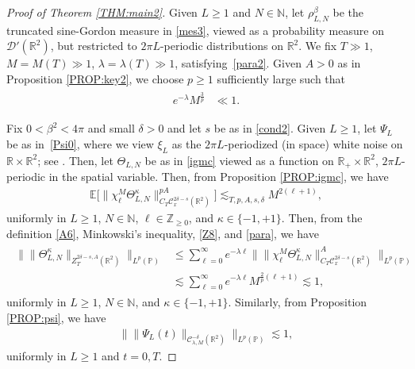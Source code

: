 \documentclass[letterpaper, 11pt,  reqno]{amsart}
\theoremstyle{myremark}
\newcommand{\Ta}{\Theta}
\newcommand{\1}{\hspace{0.5mm}\text{I}\hspace{0.5mm}}
\newcommand{\Z}{\mathbb{Z}}
\newcommand{\R}{\mathbb{R}}
\newcommand{\CC}{\mathcal{C}}
\newcommand{\E}{\mathbb{E}}
\newcommand{\be}{\beta}
\newcommand{\dl}{\delta}
\newcommand{\kk}{\kappa}
\newcommand{\ld}{\lambda}
\renewcommand{\l}{\ell}
\newcommand{\les}{\lesssim}
\newcommand{\N}{\mathbb{N}}
\newcommand{\PP}{\mathbb{P}}
\numberwithin{equation}{section}
\numberwithin{theorem}{section}
\begin{document}
\begin{proof}[Proof of Theorem \ref{THM:main2}]

Given $L \ge 1$ and $N \in \N$, 
let $\rho^{\be}_{L, N}$ be the truncated sine-Gordon measure in \eqref{mes3},
 viewed 
as a probability measure on  $\mathcal D'(\R^2)$, 
but restricted to 
$2\pi L$-periodic distributions  on $\R^2$.
We fix $T \gg 1$, $M = M(T) \gg1$, $\ld=\ld(T)\gg1 $, 
satisfying~\eqref{para2}.
Given   $A > 0$  as in Proposition \ref{PROP:key2}, 
we choose $p \ge 1$ sufficiently large such that 
\begin{align}
\begin{split}
e^{-\ld} M^{\frac 3 p} & \ll 1.
\end{split}
\label{para}
\end{align}


 
 
 Fix 
 $0 < \be^2 < 4\pi$ and small $\dl > 0$
 and let $s$ be as in \eqref{cond2}.
 Given $L \ge 1$, 
 let $\Psi_L$ be as in~\eqref{Psi0}, 
 where we view $\xi_L$ as the $2\pi L$-periodized (in space) white noise
 on $\R \times \R^2$; see \cite[Section 5]{MW2}.
Then, 
let 
  $\Ta_{L, N}$ 
be as in  \eqref{igmc} viewed as a function on $\R_+\times \R^2$, $2\pi L$-periodic in the spatial variable.
Then, from Proposition \ref{PROP:igmc}, we have 
\begin{align}
\E \big[ \| \chi^M_\l \Ta_{L, N}^\kk\|_{C_T \CC_x^{2\dl-s}(\R^2)}^{pA} \big]
 \les_{T,p, A,s,\dl} M^{2(\l+1)}, 
\label{Z8}
\end{align}
uniformly in $L \ge1$, $N \in \N$, $\l \in \Z_{\ge 0}$, 
and 
 $\kk \in \{-1,+1\}$.
Then, from the definition 
 \eqref{A6}, Minkowski's inequality,  \eqref{Z8}, and \eqref{para}, we have
\begin{align}
\begin{split}
\Big\|\|\Ta_{L, N}^\kk\|_{Z^{2\dl-s, A}_T(\R^2)}\Big\|_{L^{p}(\PP)} 
& \le \sum_{\l = 0}^\infty e^{-\ld \l} 
\Big\|\|\chi^M_\l \Ta_{L, N}^\kk\|_{C_T \CC_x^{2\dl-s}(\R^2)}^A\Big\|_{L^{p}(\PP)} \\
& \les \sum_{\l = 0}^\infty e^{-\ld \l} M^{\frac 2 p(\l+1)} \les 1,
\end{split}
\label{Z10}
\end{align}
uniformly in $L \ge1$, $N \in \N$, 
and 
 $\kk \in \{-1,+1\}$.
Similarly, from 
Proposition \ref{PROP:psi}, we have 
\begin{align}
\Big\| \|\Psi_{L}(t)\|_{\CC^{-\dl}_{\ld, M}(\R^2)} \Big\|_{L^{p}(\PP)} \les 1, 
\label{Z11}
\end{align}
uniformly in $L\ge 1$ and $t = 0, T$.


\end{proof}
\end{document}
